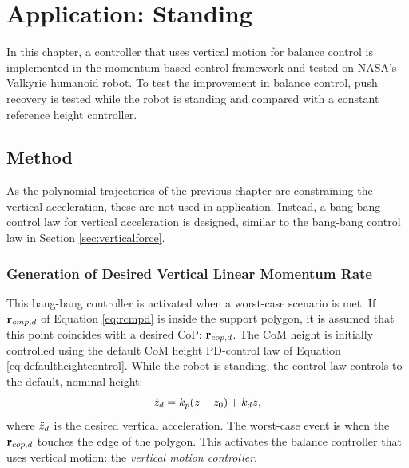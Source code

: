 \chapter{Application: Standing}\label{chap:standing}
In this chapter, a controller that uses vertical motion for balance control is implemented in the momentum-based control framework and tested on NASA's Valkyrie \cite{radford2015valkyrie} humanoid robot. To test the improvement in balance control, push recovery is tested while the robot is standing and compared with a constant reference height controller. 

\section{Method}
As the polynomial trajectories of the previous chapter are constraining the vertical acceleration, these are not used in application. Instead, a bang-bang control law for vertical acceleration is designed, similar to the bang-bang control law in Section \ref{sec:verticalforce}.

\subsection{Generation of Desired Vertical Linear Momentum Rate}
This bang-bang controller is activated when a worst-case scenario is met. If $\mathbf{r}_{cmp,d}$ of Equation \ref{eq:rcmpd} is inside the support polygon, it is assumed that this point coincides with a desired \ac{CoP}: $\mathbf{r}_{cop,d}$. The \ac{CoM} height is initially controlled using the default \ac{CoM} height PD-control law of Equation \ref{eq:defaultheightcontrol}.  While the robot is standing, the control law controls to the default, nominal height:
\begin{equation}
\ddot{z}_d =k_p(z-z_0) + k_d\dot{z},
\end{equation}
where $\ddot{z}_d$ is the desired vertical acceleration. The worst-case event is when the $\mathbf{r}_{cop,d}$ touches the edge of the polygon. This activates the balance controller that uses vertical motion: the \textit{vertical motion controller}. 

